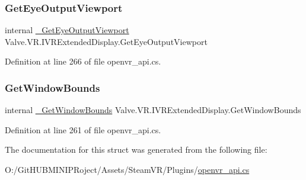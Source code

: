 \subsubsection{\texorpdfstring{GetEyeOutputViewport}{GetEyeOutputViewport}}
{\footnotesize\ttfamily internal \mbox{\hyperlink{struct_valve_1_1_v_r_1_1_i_v_r_extended_display_a6ef6cdc29a98eecafad06a70ee92e481}{\+\_\+\+Get\+Eye\+Output\+Viewport}} Valve.\+V\+R.\+I\+V\+R\+Extended\+Display.\+Get\+Eye\+Output\+Viewport}



Definition at line 266 of file openvr\+\_\+api.\+cs.

\mbox{\label{struct_valve_1_1_v_r_1_1_i_v_r_extended_display_a3ca296a728b87db0af631ce1e8d746d6}} 
\subsubsection{\texorpdfstring{GetWindowBounds}{GetWindowBounds}}
{\footnotesize\ttfamily internal \mbox{\hyperlink{struct_valve_1_1_v_r_1_1_i_v_r_extended_display_a9273a15728f289995559c641c25e8b1a}{\+\_\+\+Get\+Window\+Bounds}} Valve.\+V\+R.\+I\+V\+R\+Extended\+Display.\+Get\+Window\+Bounds}



Definition at line 261 of file openvr\+\_\+api.\+cs.



The documentation for this struct was generated from the following file\+:\begin{DoxyCompactItemize}
\item 
O\+:/\+Git\+H\+U\+B\+M\+I\+N\+I\+P\+Roject/\+Assets/\+Steam\+V\+R/\+Plugins/\mbox{\hyperlink{openvr__api_8cs}{openvr\+\_\+api.\+cs}}\end{DoxyCompactItemize}
